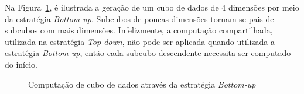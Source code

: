 Na Figura~\ref{fig:bottomup}, é ilustrada a geração de um cubo de dados de 4 dimensões por meio da estratégia \textit{Bottom-up}.
Subcubos de poucas dimensões tornam-se pais de subcubos com mais dimensões.
Infelizmente, a computação compartilhada, utilizada na estratégia \textit{Top-down}, não pode ser aplicada quando utilizada a estratégia \textit{Bottom-up}, então cada subcubo descendente necessita ser computado do início.

\begin{figure}[!htb]
	\caption{Computação de cubo de dados através da estratégia \textit{Bottom-up}}\label{fig:bottomup}
	\vspace{4mm}
	\begin{center}
	\end{center}
	\vspace{2mm}
	\legenda{}
\end{figure}


